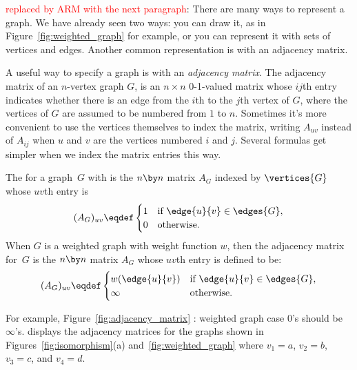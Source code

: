 \begin{editingnotes}
  \textcolor{red}{replaced by ARM with the next paragraph}: There are many
  ways to represent a graph.  We have already seen two ways: you can draw
  it, as in Figure~\ref{fig:weighted_graph} for example, or you can
  represent it with sets of vertices and edges.  Another common
  representation is with an adjacency matrix.

A useful way to specify a graph is with an \emph{adjacency matrix}.  The
adjacency matrix of an $n$-vertex graph $G$, is an $n \times n$ 0-1-valued
matrix whose $ij$th entry indicates whether there is an edge from the
$i$th to the $j$th vertex of $G$, where the vertices of $G$ are assumed to
be numbered from $1$ to $n$.  Sometimes it's more convenient to use the
vertices themselves to index the matrix, writing $A_{uv}$ instead of
$A_{ij}$ when $u$ and $v$ are the vertices numbered $i$ and $j$.  Several
formulas get simpler when we index the matrix entries this way.

\begin{definition}\label{def:adjacency_matrix}
The  for a graph~$G$ with
is the $n \by n$ matrix $A_G$  indexed by $\vertices{G}$ whose $uv$th entry is
\begin{equation*}
    (A_G)_{uv} \eqdef \begin{cases}
                1 & \text{if $\edge{u}{v} \in \edges{G}$}, \\
                0 & \text{otherwise.}
              \end{cases}
\end{equation*}
When $G$ is a weighted graph with weight function $w$, then the adjacency
matrix for~$G$ is the $n \by n$ matrix $A_G$ whose $uv$th entry is defined
to be:
\begin{equation*}
      (A_G)_{uv} \eqdef \begin{cases}
                w(\edge{u}{v}) & \text{if $\edge{u}{v} \in \edges{G}$}, \\
                \infty         & \text{otherwise.}
              \end{cases}
\end{equation*}
\end{definition}

For example, Figure~\ref{fig:adjacency_matrix}
: weighted graph case 0's should be $\infty$'s.
displays the adjacency
matrices for the graphs shown in Figures~\ref{fig:isomorphism}(a)
and~\ref{fig:weighted_graph} where $v_1 = a$, $v_2 = b$, $v_3 = c$,
and $v_4 = d$.


\end{editingnotes}
